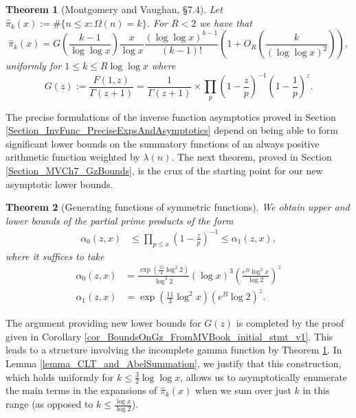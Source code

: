 \documentclass[11pt,reqno,a4letter]{article}
\numberwithin{figure}{section}
\numberwithin{table}{section}
\theoremstyle{plain}
\newtheorem{theorem}{Theorem}
\numberwithin{theorem}{section}
\theoremstyle{definition}
\begin{document}
\begin{theorem}[Montgomery and Vaughan, \S 7.4]
\label{theorem_HatPi_ExtInTermsOfGz} 
Let $\widehat{\pi}_k(x) := \#\{n \leq x: \Omega(n)=k\}$. For $R < 2$ we have that 
\[
\widehat{\pi}_k(x) = G\left(\frac{k-1}{\log\log x}\right) \frac{x}{\log x} 
     \frac{(\log\log x)^{k-1}}{(k-1)!} \left(1 + O_R\left(\frac{k}{(\log\log x)^2}\right)\right),  
\]
uniformly for $1 \leq k \leq R \log\log x$ where 
\[
G(z) := \frac{F(1, z)}{\Gamma(z+1)} = \frac{1}{\Gamma(z+1)} \times 
     \prod_p \left(1-\frac{z}{p}\right)^{-1} \left(1-\frac{1}{p}\right)^z. 
\]
\end{theorem} 

The precise formulations of the inverse function asymptotics 
proved in Section \ref{Section_InvFunc_PreciseExpsAndAsymptotics} depend on being able to form 
significant lower bounds on the summatory functions of an always positive arithmetic function 
weighted by $\lambda(n)$. 
The next theorem, proved in Section \ref{Section_MVCh7_GzBounds}, 
is the crux of the starting point for our new asymptotic lower bounds. 

\begin{theorem}[Generating functions of symmetric functions] 
\label{theorem_GFs_SymmFuncs_SumsOfRecipOfPowsOfPrimes} 
We obtain upper and lower bounds of the partial prime products of the form
\begin{align*} 
\alpha_0(z, x) & \leq \prod_{p \leq x} \left(1-\frac{z}{p}\right)^{-1} \leq \alpha_1(z, x), 
\end{align*} 
where it suffices to take 
\begin{align*}
\alpha_0(z, x) & = \frac{\exp\left(\frac{55}{4} \log^2 2\right)}{\log^3 2} (\log x)^3 
     \left(\frac{e^{B} \log^2 x}{\log 2}\right)^{z} \\ 
\alpha_1(z, x) & = \exp\left(\frac{11}{3} \log^2 x\right) \left(e^{B} \log 2\right)^{z}. 
\end{align*}  
\end{theorem} 

The argument providing new lower bounds for $G(z)$ is completed by the 
proof given in Corollary \ref{cor_BoundsOnGz_FromMVBook_initial_stmt_v1}. 
This leads to a structure involving the 
incomplete gamma function by Theorem \ref{theorem_HatPi_ExtInTermsOfGz}. 
In Lemma \ref{lemma_CLT_and_AbelSummation}, we justify that this construction, 
which holds uniformly for 
$k \leq \frac{3}{2} \log\log x$, allows us to asymptotically enumerate the main terms 
in the expansions of $\widehat{\pi}_k(x)$ when we sum over just $k$ in this range 
(as opposed to $k \leq \frac{\log x}{\log 2}$). 
\end{document}
